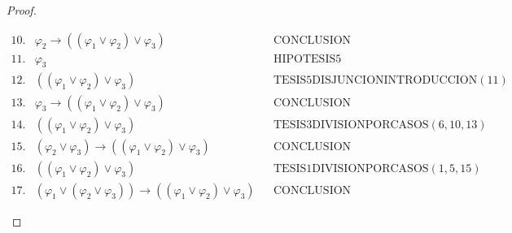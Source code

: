 \begin{proof}
\begin{enumerate}[(1)]
\[\begin{array}{llll}
            10. & \varphi_{2} \rightarrow ((\varphi_{1} \vee \varphi_{2}) \vee \varphi_{3}) && \text{CONCLUSION} \\
            11. & \varphi_{3} && \text{HIPOTESIS5} \\
            12. & ((\varphi_{1} \vee \varphi_{2}) \vee \varphi_{3}) && \text{TESIS5DISJUNCIONINTRODUCCION}(11) \\
            13. & \varphi_{3} \rightarrow ((\varphi_{1} \vee \varphi_{2}) \vee \varphi_{3}) && \text{CONCLUSION} \\
            14. & ((\varphi_{1} \vee \varphi_{2}) \vee \varphi_{3}) && \text{TESIS3DIVISIONPORCASOS}(6,10,13) \\
            15. & (\varphi_{2} \vee \varphi_{3}) \rightarrow ((\varphi_{1} \vee \varphi_{2}) \vee \varphi_{3}) &&
              \text{CONCLUSION} \\
            16. & ((\varphi_{1} \vee \varphi_{2}) \vee \varphi_{3}) && \text{TESIS1DIVISIONPORCASOS}(1,5,15) \\
            17. & (\varphi_{1} \vee (\varphi_{2} \vee \varphi_{3})) \rightarrow ((\varphi_{1} \vee \varphi_{2}) \vee
              \varphi_{3}) && \text{CONCLUSION}
          \end{array}
        \]


\end{enumerate}
\end{proof}
